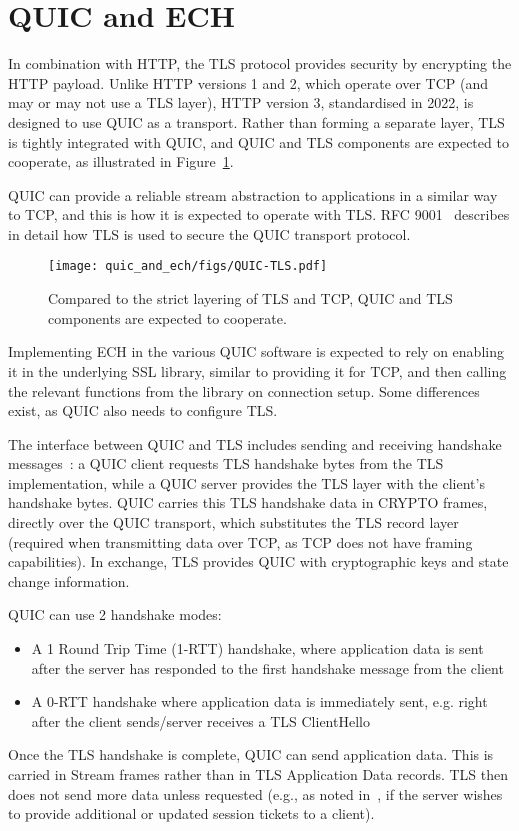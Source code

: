 \section{QUIC and ECH}

In combination with HTTP, the TLS protocol provides security by encrypting the HTTP payload. 
Unlike HTTP versions 1 and 2, which operate over TCP (and may or may not use a TLS layer),
HTTP version 3, standardised in 2022, is designed to use QUIC as a transport.
Rather than forming a separate layer, TLS is tightly integrated with QUIC, and QUIC and TLS components are expected to cooperate, as illustrated in Figure~\ref{fig:quic-tls}.

QUIC can provide a reliable stream abstraction to applications in a similar way to TCP, and this is how it is expected to operate with TLS. 
RFC 9001~\cite{rfc9001} describes in detail how TLS is used to secure the QUIC transport protocol. 

\begin{figure}[h]
    \centering
    \texttt{[image: quic\_and\_ech/figs/QUIC-TLS.pdf]}
    \caption{Compared to the strict layering of TLS and TCP, QUIC and TLS components are expected to cooperate.}
    \label{fig:quic-tls}
\end{figure}

Implementing ECH in the various QUIC software is expected to rely on enabling it in the underlying SSL library, similar to providing it for TCP, and then calling the relevant functions from the library on connection setup.
Some differences exist, as QUIC also needs to configure TLS.

The interface between QUIC and TLS includes sending and receiving handshake messages~\cite{rfc9001}:
a QUIC client requests TLS handshake bytes from the TLS implementation, while a QUIC server provides the TLS layer with the client's handshake bytes. QUIC carries this TLS handshake data in CRYPTO frames, directly over the QUIC transport, which substitutes the TLS record layer (required when transmitting data over TCP, as TCP does not have framing capabilities).
In exchange, TLS provides QUIC with cryptographic keys and state change information.

QUIC can use 2 handshake modes:
\begin{itemize}
    \item  A 1 Round Trip Time (1-RTT) handshake, where application data is sent after the server has responded to the first handshake message from the client
     \item A 0-RTT handshake where application data is immediately sent, e.g. right after the client sends/server receives a TLS ClientHello
\end{itemize}

Once the TLS handshake is complete, QUIC can send application data. This is carried in Stream frames rather than in TLS Application Data records. TLS then does not send more data unless requested (e.g., as noted in~\cite{rfc9001}, if the server wishes to provide additional or updated session tickets to a client).
